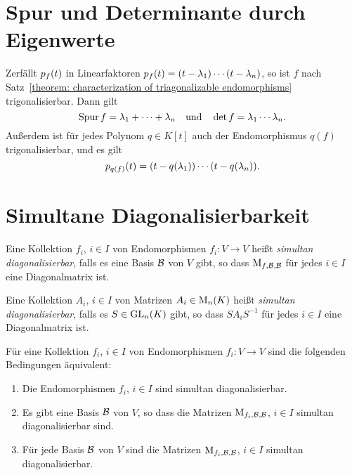 \section{Spur und Determinante durch Eigenwerte}
\label{section: trace and determinant via eigenvalues}

Zerfällt $p_{f}(t)$ in Linearfaktoren $p_{f}(t) = (t - \lambda_1) \dotsm (t - \lambda_n)$, so ist $f$ nach Satz~\ref{theorem: characterization of triagonalizable endomorphisms} trigonalisierbar.
Dann gilt
\[
    \operatorname{Spur} f
  = \lambda_1 + \dotsb + \lambda_n
\quad\text{und}\quad
    \det f
  = \lambda_1 \dotsm \lambda_n.
\]
Außerdem ist für jedes Polynom $q \in K[t]$ auch der Endomorphismus $q(f)$ trigonalisierbar, und es gilt
\[
    p_{q(f)}(t)
  = (t - q(\lambda_1)) \dotsm (t - q(\lambda_n)).
\]





\section{Simultane Diagonalisierbarkeit}

\begin{definition}
  Eine Kollektion $f_i$, $i \in I$ von Endomorphismen $f_i \colon V \to V$ heißt \emph{simultan diagonalisierbar}, falls es eine Basis $\mathcal{B}$ von $V$ gibt, so dass $\operatorname{M}_{f, \mathcal{B}, \mathcal{B}}$ für jedes $i \in I$ eine Diagonalmatrix ist.
  
  Eine Kollektion $A_i$, $i \in I$ von Matrizen $A_i \in \operatorname{M}_{n}(K)$ heißt \emph{simultan diagonalisierbar}, falls es $S \in \operatorname{GL}_{n}(K)$ gibt, so dass $S A_i S^{-1}$ für jedes $i \in I$ eine Diagonalmatrix ist.
\end{definition}

\begin{lemma}
  Für eine Kollektion $f_i$, $i \in I$ von Endomorphismen $f_i \colon V \to V$ sind die folgenden Bedingungen äquivalent:
  \begin{enumerate}
    \item
      Die Endomorphismen $f_i$, $i \in I$ sind simultan diagonalisierbar.
    \item
      Es gibt eine Basis $\mathcal{B}$ von $V$, so dass die Matrizen $\operatorname{M}_{f_i, \mathcal{B}, \mathcal{B}}$, $i \in I$ simultan diagonalisierbar sind.
    \item
      Für jede Basis $\mathcal{B}$ von $V$ sind die Matrizen $\operatorname{M}_{f_i, \mathcal{B}, \mathcal{B}}$, $i \in I$ simultan diagonalisierbar.
  \end{enumerate}
\end{lemma}

